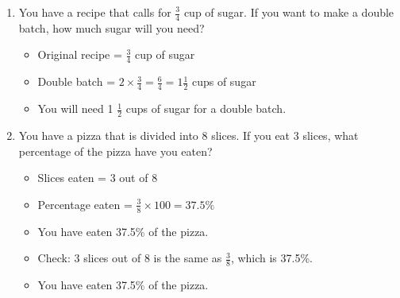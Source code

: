 \begin{enumerate}[label=(\alph*)]
\begin{itemize}
        \end{itemize}
    \item You have a recipe that calls for $\frac{3}{4}$ cup of sugar. If you want to make a double batch, how much sugar will you need?
        \begin{itemize}
            \item Original recipe = $\frac{3}{4}$ cup of sugar
            \item Double batch = $2 \times \frac{3}{4} = \frac{6}{4} = 1 \frac{1}{2}$ cups of sugar
            \item You will need 1 $\frac{1}{2}$ cups of sugar for a double batch.
        \end{itemize}
    \item You have a pizza that is divided into 8 slices. If you eat 3 slices, what percentage of the pizza have you eaten?
        \begin{itemize}
            \item Slices eaten = 3 out of 8
            \item Percentage eaten = $\frac{3}{8} \times 100 = 37.5\%$
            \item You have eaten 37.5\% of the pizza.
            \item Check: 3 slices out of 8 is the same as $\frac{3}{8}$, which is 37.5\%.
            \item You have eaten 37.5\% of the pizza.
        \end{itemize}
\end{enumerate}